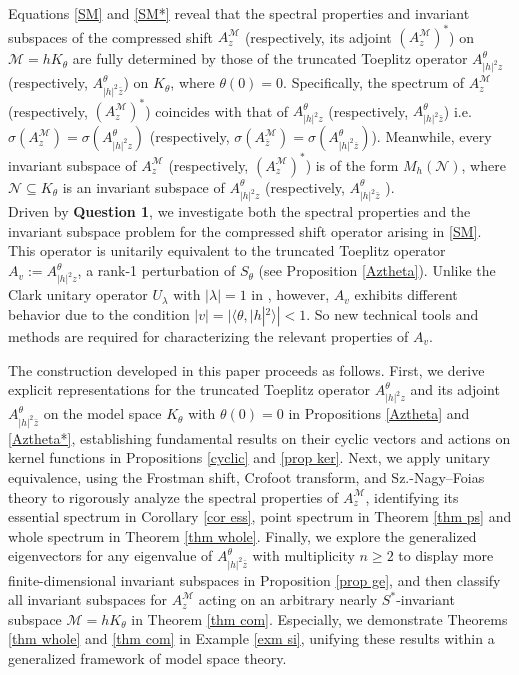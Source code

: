 \documentclass[12pt,reqno]{amsart}
\theoremstyle{definition}
\theoremstyle{remark}
\numberwithin{equation}{section}
\newcommand{\la}{\langle}
\newcommand{\ra}{\rangle}
\newcommand{\ol}{\overline}
\newcommand{\ma}{\mathcal}
\begin{document}
Equations \eqref{SM} and \eqref{SM*} reveal that the spectral properties and invariant subspaces of the compressed shift $A_z^\ma{M}$ (respectively, its adjoint $(A_z^\ma{M})^*$)  on $\ma{M}=hK_\theta$ are fully determined by those of the truncated Toeplitz operator $A_{|h|^2z}^\theta$ (respectively,   $A_{|h|^2\bar{z}}^\theta$) on $K_\theta$, where $\theta(0)=0$. Specifically, the spectrum of $A_z^\ma{M}$ (respectively, $(A_z^\ma{M})^*$) coincides with that of $A_{|h|^2z}^\theta$ (respectively,  $A_{|h|^2\bar{z}}^\theta$) i.e. $\sigma(A_z^\ma{M})=\sigma(A_{|h|^2z}^\theta)$ (respectively, $\sigma(A_{\ol{z}}^\ma{M})=\sigma(A_{|h|^2\ol{z}}^\theta)$). Meanwhile, every invariant subspace  of $A_z^\ma{M}$ (respectively, $(A_z^\ma{M})^*$) is of the form $M_h(\ma{N})$, where $\ma{N}\subseteq K_\theta$ is an invariant subspace of $A_{|h|^2z}^\theta$ (respectively, $A_{|h|^2\bar{z}}^\theta$ ).\\

Driven by {\bf Question 1}, we investigate both the spectral properties and the invariant subspace problem for the   compressed shift operator arising in \eqref{SM}. This operator is unitarily equivalent to the truncated Toeplitz operator $A_v:=A_{|h|^2 z}^\theta$,  a rank-1 perturbation of $S_\theta$ (see Proposition \ref{Aztheta}). Unlike the Clark unitary operator $U_\lambda$ with $|\lambda|=1$ in \cite{Clark}, however, $A_v$ exhibits different behavior due to the condition $|v|=|\la \theta, |h|^2\ra|<1$. So new technical tools and methods are required for characterizing the relevant properties of $A_v$.

 The construction developed in this paper proceeds as follows. First, we derive explicit representations for the truncated Toeplitz operator $A_{|h|^2z}^\theta$ and its adjoint $A_{|h|^2\bar{z}}^\theta$ on the model space $ K_\theta$ with $\theta(0)=0$  in Propositions \ref{Aztheta} and \ref{Aztheta*}, establishing fundamental results on their cyclic vectors and actions on kernel functions in Propositions \ref{cyclic} and \ref{prop ker}. Next, we apply unitary equivalence, using the Frostman shift, Crofoot transform, and  Sz.-Nagy--Foias theory to rigorously analyze the spectral properties of $A_z^\ma{M}$, identifying its essential spectrum in Corollary \ref{cor ess},  point spectrum in Theorem \ref{thm ps} and whole spectrum in Theorem \ref{thm whole}.  Finally, we explore the generalized eigenvectors for any eigenvalue of $A_{|h|^2\bar{z}}^\theta$ with multiplicity $n \geq 2$ to display more finite-dimensional invariant subspaces in Proposition \ref{prop ge},  and then classify all invariant subspaces for   $A_z^\ma{M}$ acting on an arbitrary nearly $S^*$-invariant subspace $\ma{M}=hK_\theta$ in Theorem \ref{thm com}. Especially, we demonstrate Theorems \ref{thm whole} and  \ref{thm com} in Example \ref{exm si},  unifying these results within a generalized framework of model space theory.
\end{document}

